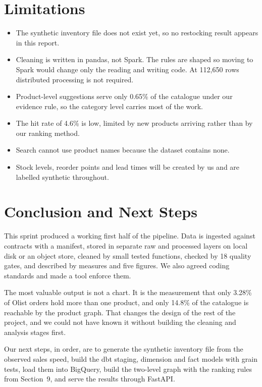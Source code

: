 \documentclass[11pt,a4paper]{article}
\begin{document}
\section{Limitations}
\begin{itemize}
  \item The synthetic inventory file does not exist yet, so no restocking result appears in this report.
  \item Cleaning is written in pandas, not Spark. The rules are shaped so moving to Spark would change only the reading and writing code. At 112{,}650 rows distributed processing is not required.
  \item Product-level suggestions serve only 0.65\% of the catalogue under our evidence rule, so the category level carries most of the work.
  \item The hit rate of 4.6\% is low, limited by new products arriving rather than by our ranking method.
  \item Search cannot use product names because the dataset contains none.
  \item Stock levels, reorder points and lead times will be created by us and are labelled synthetic throughout.
\end{itemize}

\section{Conclusion and Next Steps}
This sprint produced a working first half of the pipeline. Data is ingested against contracts
with a manifest, stored in separate raw and processed layers on local disk or an object store,
cleaned by small tested functions, checked by 18 quality gates, and described by measures and
five figures. We also agreed coding standards and made a tool enforce them.

The most valuable output is not a chart. It is the measurement that only 3.28\% of Olist orders
hold more than one product, and only 14.8\% of the catalogue is reachable by the product graph.
That changes the design of the rest of the project, and we could not have known it without
building the cleaning and analysis stages first.

Our next steps, in order, are to generate the synthetic inventory file from the observed sales
speed, build the dbt staging, dimension and fact models with grain tests, load them into
BigQuery, build the two-level graph with the ranking rules from Section~9, and serve the results
through FastAPI.
\end{document}

